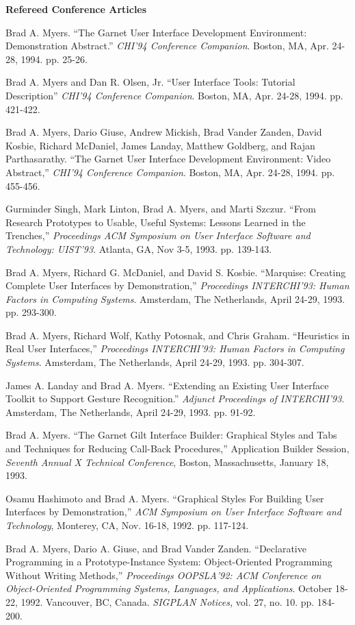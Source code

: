 {\bf Refereed Conference Articles}

Brad A. Myers. ``The Garnet User Interface Development Environment:
Demonstration Abstract.'' {\it CHI'94 Conference Companion}.  Boston,
MA, Apr. 24-28, 1994. pp. 25-26.

Brad A. Myers and Dan R. Olsen, Jr. ``User Interface Tools: Tutorial
Description'' {\it CHI'94 Conference Companion}.  Boston,
MA, Apr. 24-28, 1994. pp. 421-422.

Brad A. Myers, Dario Giuse, Andrew Mickish, Brad Vander Zanden, David
Kosbie, Richard McDaniel, James Landay, Matthew Goldberg, and Rajan
Parthasarathy. ``The Garnet User Interface Development Environment:
Video Abstract,'' {\it CHI'94 Conference Companion}.  Boston, MA, Apr.
24-28, 1994. pp. 455-456.

Gurminder Singh, Mark Linton, Brad A. Myers, and Marti Szczur. ``From
Research Prototypes to Usable, Useful Systems: Lessons Learned in the
Trenches,'' {\it Proceedings ACM Symposium on User Interface Software
and Technology: UIST'93}. Atlanta, GA, Nov 3-5, 1993.  pp. 139-143.

Brad A. Myers, Richard G. McDaniel, and David S. Kosbie.  ``Marquise:
Creating Complete User Interfaces by Demonstration,'' {\it Proceedings
INTERCHI'93: Human Factors in Computing Systems}.  Amsterdam, The Netherlands,
April 24-29, 1993.  pp. 293-300.

Brad A. Myers, Richard Wolf, Kathy Potosnak, and Chris Graham.
``Heuristics in Real User Interfaces,''  {\it Proceedings
INTERCHI'93: Human Factors in Computing Systems}.  Amsterdam, The
Netherlands, April 24-29, 1993.  pp. 304-307.

James A. Landay and Brad A. Myers. ``Extending an Existing User Interface
Toolkit to Support Gesture Recognition.'' {\it Adjunct Proceedings of
INTERCHI'93}. Amsterdam, The Netherlands, April 24-29, 1993.  pp. 91-92.

Brad A. Myers. ``The Garnet Gilt Interface Builder: Graphical Styles
and Tabs and Techniques for Reducing Call-Back Procedures,''
Application Builder Session, {\it Seventh Annual X Technical
Conference}, Boston, Massachusetts, January 18, 1993.

Osamu Hashimoto and Brad A. Myers. ``Graphical Styles For Building
User Interfaces by Demonstration,'' {\it ACM Symposium on User Interface
Software and Technology}, Monterey, CA, Nov. 16-18, 1992. pp. 117-124.

Brad A. Myers, Dario A. Giuse, and Brad Vander Zanden. ``Declarative
Programming in a Prototype-Instance System: Object-Oriented
Programming Without Writing Methods,'' {\it Proceedings OOPSLA'92: ACM
Conference on Object-Oriented Programming Systems, Languages, and
Applications}.  October 18-22, 1992.  Vancouver, BC, Canada.
{\it SIGPLAN Notices,} vol. 27, no. 10. pp. 184-200.

